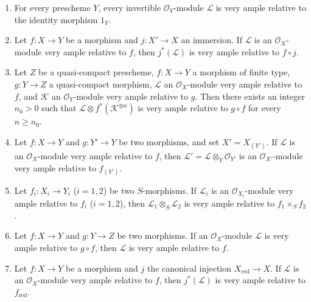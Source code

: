 \begin{proposition}[4.4.10]
\label{II.4.4.10}
\begin{enumerate}
  \item[\rm{(i)}] For every prescheme $Y$, every invertible
  $\mathcal{O}_Y$-module $\mathcal{L}$ is very ample relative to the identity
  morphism $1_Y$.
  \item[\rm{(i \emph{bis})}] Let $f:X\to Y$ be a morphism and $j:X'\to X$ an
  immersion. If $\mathcal{L}$ is an $\mathcal{O}_X$-module very ample
  relative to $f$, then $j^*(\mathcal{L})$ is very ample relative to
  $f\circ j$.
  \item[\rm{(ii)}] Let $Z$ be a quasi-compact prescheme, $f:X\to Y$ a
  morphism of finite type, $g:Y\to Z$ a quasi-compact morphism,
  $\mathcal{L}$ an $\mathcal{O}_X$-module very ample relative to $f$, and
  $\mathcal{K}$ an $\mathcal{O}_Y$-module very ample relative to $g$.
  Then there exists an integer $n_0>0$ such that
  $\mathcal{L}\otimes f^*(\mathcal{K}^{\otimes n})$ is very ample
  relative to $g\circ f$ for every $n\geq n_0$.
  \item[\rm{(iii)}] Let $f:X\to Y$ and $g:Y'\to Y$ be two morphisms, and set
  $X'=X_{(Y')}$. If $\mathcal{L}$ is an $\mathcal{O}_X$-module very ample
  relative to $f$, then $\mathcal{L}'=\mathcal{L}\otimes_Y\mathcal{O}_{Y'}$
  is an $\mathcal{O}_{X'}$-module very ample relative to $f_{(Y')}$.
  \item[\rm{(iv)}] Let $f_i:X_i\to Y_i$ ($i=1,2$) be two $S$-morphisms.
  If $\mathcal{L}_i$ is an $\mathcal{O}_{X_i}$-module very ample relative
  to $f_i$ ($i=1,2$), then $\mathcal{L}_1\otimes_S\mathcal{L}_2$ is very ample
  relative to $f_1\times_Sf_2$.
  \item[\rm{(v)}] Let $f:X\to Y$ and $g:Y\to Z$ be two morphisms. If an
  $\mathcal{O}_X$-module $\mathcal{L}$ is very ample relative to
  $g\circ f$, then $\mathcal{L}$ is very ample relative to $f$.
  \item[\rm{(vi)}] Let $f:X\to Y$ be a morphism and $j$ the canonical
  injection $X_{\mathrm{red}}\to X$. If $\mathcal{L}$ is an
  $\mathcal{O}_X$-module very ample relative to $f$, then $j^*(\mathcal{L})$
  is very ample relative to $f_{\mathrm{red}}$.
\end{enumerate}
\end{proposition}

